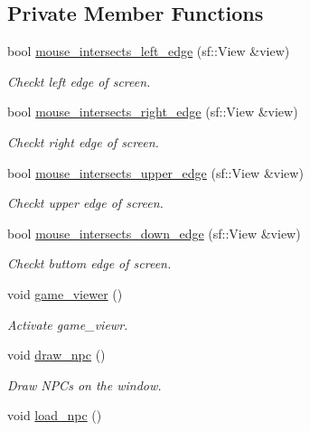 \subsection*{Private Member Functions}
\begin{DoxyCompactItemize}
\item 
bool \hyperlink{classgame_ae263cdc30dcc916b98b0ddbbf0a6fccc}{mouse\+\_\+intersects\+\_\+left\+\_\+edge} (sf\+::\+View \&view)
\begin{DoxyCompactList}\small\item\em Checkt left edge of screen. \end{DoxyCompactList}\item 
bool \hyperlink{classgame_a273013552bc7ad8fef9d9192aad3cc0c}{mouse\+\_\+intersects\+\_\+right\+\_\+edge} (sf\+::\+View \&view)
\begin{DoxyCompactList}\small\item\em Checkt right edge of screen. \end{DoxyCompactList}\item 
bool \hyperlink{classgame_abb1c33c5a73de27e4ebd20e1b61dc3dc}{mouse\+\_\+intersects\+\_\+upper\+\_\+edge} (sf\+::\+View \&view)
\begin{DoxyCompactList}\small\item\em Checkt upper edge of screen. \end{DoxyCompactList}\item 
bool \hyperlink{classgame_a34a5241e205d0985a9e477a3dd77ba08}{mouse\+\_\+intersects\+\_\+down\+\_\+edge} (sf\+::\+View \&view)
\begin{DoxyCompactList}\small\item\em Checkt buttom edge of screen. \end{DoxyCompactList}\item 
void \hyperlink{classgame_a69793e75c155cb06e4f2c4d98c5da27c}{game\+\_\+viewer} ()
\begin{DoxyCompactList}\small\item\em Activate game\+\_\+viewr. \end{DoxyCompactList}\item 
void \hyperlink{classgame_a961fe8a42a2c0bc1ef62ef17c7c64f06}{draw\+\_\+npc} ()
\begin{DoxyCompactList}\small\item\em Draw N\+PC\textquotesingle{}s on the window. \end{DoxyCompactList}\item 
void \hyperlink{classgame_a3718980f99cd44e9c882c2aa67368450}{load\+\_\+npc} ()

\end{DoxyCompactItemize}
